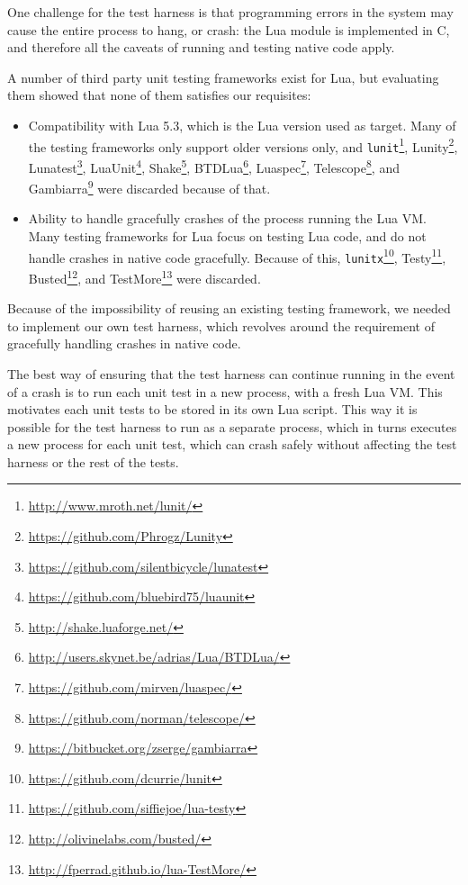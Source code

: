 One challenge for the test harness is that programming errors in the system
may cause the entire process to hang, or crash: the \Eol* Lua module is
implemented in C, and therefore all the caveats of running and testing native
code apply.

A number of third party unit testing frameworks exist for Lua, but evaluating
them showed that none of them satisfies our requisites:

\begin{itemize}

	\item Compatibility with Lua 5.3, which is the Lua version used as target.
		Many of the testing frameworks only support older versions only, and
		\texttt{lunit}\footnote{\url{http://www.mroth.net/lunit/}},
		Lunity\footnote{\url{https://github.com/Phrogz/Lunity}},
		Lunatest\footnote{\url{https://github.com/silentbicycle/lunatest}},
		LuaUnit\footnote{\url{https://github.com/bluebird75/luaunit}},
		Shake\footnote{\url{http://shake.luaforge.net/}},
		BTDLua\footnote{\url{http://users.skynet.be/adrias/Lua/BTDLua/}},
		Luaspec\footnote{\url{https://github.com/mirven/luaspec/}},
		Telescope\footnote{\url{https://github.com/norman/telescope/}}, and
		Gambiarra\footnote{\url{https://bitbucket.org/zserge/gambiarra}} were
		discarded because of that.

	\item Ability to handle gracefully crashes of the process running the Lua
		VM. Many testing frameworks for Lua focus on testing Lua code, and do not
		handle crashes in native code gracefully. Because of this,
		\texttt{lunitx}\footnote{\url{https://github.com/dcurrie/lunit}},
		Testy\footnote{\url{https://github.com/siffiejoe/lua-testy}},
		Busted\footnote{\url{http://olivinelabs.com/busted/}}, and
		TestMore\footnote{\url{http://fperrad.github.io/lua-TestMore/}}
		were discarded.

\end{itemize}

Because of the impossibility of reusing an existing testing framework, we
needed to implement our own test harness, which revolves around the
requirement of gracefully handling crashes in native code.


The best way of ensuring that the test harness can continue running in the
event of a crash is to run each unit test in a new process, with a fresh Lua
VM. This motivates each unit tests to be stored in its own Lua script. This
way it is possible for the test harness to run as a separate process, which in
turns executes a new process for each unit test, which can crash safely
without affecting the test harness or the rest of the tests.

